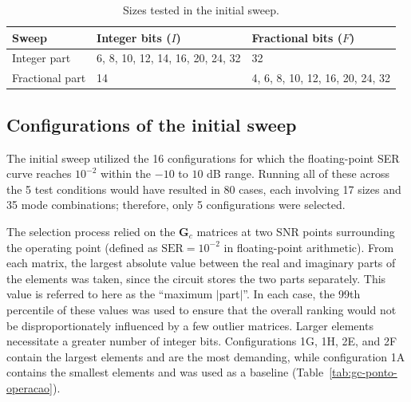 \begin{table}[htbp]
\caption{Sizes tested in the initial sweep.}
\label{tab:varredura-inicial}
\vspace{4pt} %
\centering
\footnotesize
\renewcommand{\arraystretch}{1.2}
\begin{tabular}{lll}
\toprule
\textbf{Sweep} & \textbf{Integer bits} ({\boldmath $I$}) & \textbf{Fractional bits} ({\boldmath $F$}) \\
\midrule
Integer part & 6, 8, 10, 12, 14, 16, 20, 24, 32 & 32 \\
Fractional part & 14 & 4, 6, 8, 10, 12, 16, 20, 24, 32 \\
\bottomrule
\end{tabular}
\vspace{4pt}
\end{table}

\subsection{\texorpdfstring{Configurations of the initial sweep}{Configurations of the initial sweep}}
The initial sweep utilized the 16 configurations for which the floating-point SER curve reaches $10^{-2}$ within the $-10$ to $10$ dB range. Running all of these across the 5 test conditions would have resulted in 80 cases, each involving 17 sizes and 35 mode combinations; therefore, only 5 configurations were selected.


The selection process relied on the $\mathbf{G}_c$ matrices at two SNR points surrounding the operating point (defined as $\mathrm{SER} = 10^{-2}$ in floating-point arithmetic). From each matrix, the largest absolute value between the real and imaginary parts of the elements was taken, since the circuit stores the two parts separately. This value is referred to here as the ``maximum $|$part$|$''. In each case, the 99th percentile of these values was used to ensure that the overall ranking would not be disproportionately influenced by a few outlier matrices. Larger elements necessitate a greater number of integer bits. Configurations 1G, 1H, 2E, and 2F contain the largest elements and are the most demanding, while configuration 1A contains the smallest elements and was used as a baseline (Table~\ref{tab:gc-ponto-operacao}).


